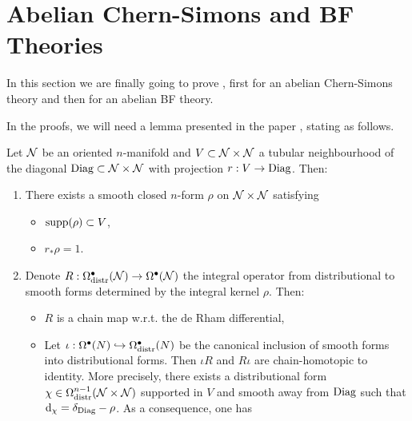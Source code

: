 \section{Abelian Chern-Simons and BF Theories}
\label{sec:abelain_chern_simons_BF_theories}

In this section we are finally going to prove , first for an abelian Chern-Simons theory and then for an abelian BF theory.

In the proofs, we will need a lemma presented in the paper \cite{Gluing_BV-BFV}, stating as follows.

\begin{lemma}
\label{lemma:tubular_neighbourhood}
    Let $\mathcal{N}$ be an oriented $n$-manifold and $V \subset \mathcal{N} \times \mathcal{N}$ a tubular neighbourhood of the diagonal $\text{\normalfont Diag} \subset \mathcal{N} \times \mathcal{N}$ with projection $r: V \rightarrow \text{\normalfont Diag}$.
    Then:
    \begin{enumerate}[label={\normalfont \alph*)}]
        \item \label{enum:tubular_a} There exists a smooth closed $n$-form $\rho$ on $\mathcal{N} \times \mathcal{N}$ satisfying
        \begin{itemize}[label= $\diamond$]
            \item $\text{\normalfont supp}(\rho) \subset V$,
            \item $r_* \rho = 1$.
        \end{itemize}
        \item \label{enum:tubular_b} Denote $R: \Omega^\bullet_{\text{\normalfont distr}} (\mathcal{N}) \rightarrow \Omega^\bullet (\mathcal{N})$ the integral operator from distributional to smooth forms determined by the integral kernel $\rho$.
        Then:
        \begin{itemize}[label= $\diamond$]
            \item $R$ is a chain map w.r.t. the de Rham differential,
            \item Let $\iota: \Omega^\bullet (N) \hookrightarrow \Omega^\bullet_{\text{\normalfont distr}} (N)$ be the canonical inclusion of smooth forms into distributional forms.
            Then $\iota R$ and $R \iota$ are chain-homotopic to identity.
            More precisely, there exists a distributional form $\chi \in \Omega_{\text{\normalfont distr}}^{n-1} (\mathcal{N} \times \mathcal{N})$ supported in $V$ and smooth away from $\text{\normalfont Diag}$ such that $\dd_\chi = \delta_{\text{\normalfont Diag}} - \rho$.
            As a consequence, one has
            \begin{equation}
            \label{eq:chain_homotopy_lemma}
                \begin{aligned}

\end{aligned}
\end{equation}
\end{itemize}
\end{enumerate}
\end{lemma}
